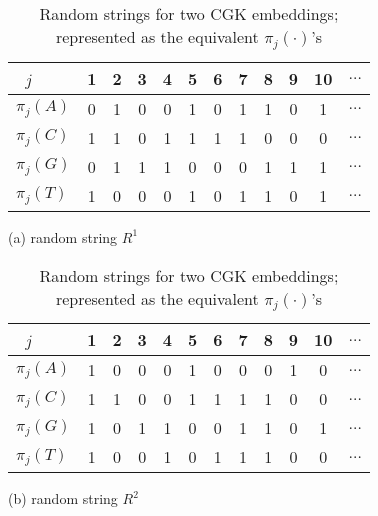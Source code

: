 \begin{table}[t]
\centering
\begin{minipage}[]{0.65\textwidth}
\centering
\begin{tabular}{l*{10}{c}r}
\ $j$              & 1 & 2 & 3 & 4 & 5  & 6 & 7 & 8  & 9 & 10 & $\dots$  \\
\hline
$\pi_j(A)$    & 0 & 1 & 0 & 0 & 1 & 0 & 1 & 1 & 0 & 1  & $\dots$\\
$\pi_j(C)$     & 1 & 1 & 0 & 1 & 1 & 1 & 1 & 0 & 0 & 0 & $\dots$ \\
$\pi_j(G)$    & 0 & 1 & 1 & 1 & 0& 0 & 0 & 1 & 1 & 1  & $\dots$\\
$\pi_j(T)$     & 1 & 0 & 0 & 0 & 1 & 0 & 1 & 1 & 0 & 1  & $\dots$ \\
\end{tabular}
\centerline{(a) random string $R^1$}
\smallskip
\end{minipage}

\begin{minipage}[]{0.65\textwidth}
\centering
\begin{tabular}{l*{10}{c}r}
\ $j$              & 1 & 2 & 3 & 4 & 5  & 6 & 7 & 8  & 9 & 10 & $\dots$  \\
\hline
$\pi_j(A)$    & 1 & 0 & 0 & 0 & 1 & 0 & 0 & 0 & 1 & 0  & $\dots$\\
$\pi_j(C)$     & 1 & 1 & 0 & 0 & 1 & 1 & 1 & 1 & 0 & 0 & $\dots$ \\
$\pi_j(G)$    & 1 & 0 & 1 & 1 & 0& 0 & 1 & 1 & 0 & 1  & $\dots$\\
$\pi_j(T)$     & 1 & 0 & 0 & 1 & 0 & 1 & 1 & 1 & 0 & 0  & $\dots$ \\
\end{tabular}
\centerline{(b) random string $R^2$}
\end{minipage}
\medskip
 \caption{Random strings for two CGK embeddings; represented as the equivalent $\pi_j(\cdot)$'s} 
\label{tab:CGK}
\end{table}



